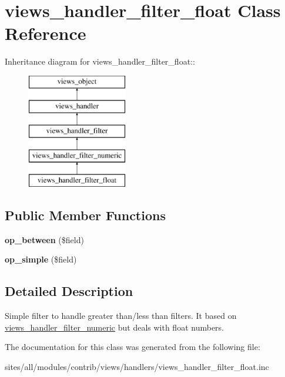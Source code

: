 \hypertarget{classviews__handler__filter__float}{
\section{views\_\-handler\_\-filter\_\-float Class Reference}
\label{classviews__handler__filter__float}
}
Inheritance diagram for views\_\-handler\_\-filter\_\-float::\begin{figure}[H]
\begin{center}
\leavevmode
\includegraphics[height=5cm]{classviews__handler__filter__float}
\end{center}
\end{figure}
\subsection*{Public Member Functions}
\begin{CompactItemize}
\item 
\hypertarget{classviews__handler__filter__float_fa83a22167ab8440532e3574c07a01f2}{
\textbf{op\_\-between} (\$field)}
\label{classviews__handler__filter__float_fa83a22167ab8440532e3574c07a01f2}

\item 
\hypertarget{classviews__handler__filter__float_fad83b4e54a76fb7dbd204278f4a243d}{
\textbf{op\_\-simple} (\$field)}
\label{classviews__handler__filter__float_fad83b4e54a76fb7dbd204278f4a243d}

\end{CompactItemize}


\subsection{Detailed Description}
Simple filter to handle greater than/less than filters. It based on \hyperlink{classviews__handler__filter__numeric}{views\_\-handler\_\-filter\_\-numeric} but deals with float numbers. 

The documentation for this class was generated from the following file:\begin{CompactItemize}
\item 
sites/all/modules/contrib/views/handlers/views\_\-handler\_\-filter\_\-float.inc\end{CompactItemize}
